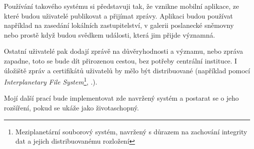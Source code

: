 \documentclass{report}
\begin{document}
Používání takového systému si představuji tak, že vznikne mobilní aplikace, ze které budou uživatelé publikovat a přijímat zprávy. Aplikaci budou používat například na zasedání lokálních zastupitelství, v galerii poslanecké sněmovny nebo prostě když budou svědkem události, která jim přijde významná.

Ostatní uživatelé pak dodají zprávě na důvěryhodnosti a významu, nebo zpráva zapadne, toto se bude dít přirozenou cestou, bez potřeby centrální instituce. I úložiště zpráv a certifikátů uživatelů by mělo být distribuované (například pomocí \textit{Interplanetary File System}\footnote{Meziplanetární souborový systém, navržený s důrazem na zachování integrity dat a jejich distribuovanému rozložení}, \cite{benet14}.).

Mojí další prací bude implementovat zde navržený systém a postarat se o jeho rozšíření, pokud se ukáže jako životaschopný.

\printglossaries
\printbibliography[heading=bibintoc]
\end{document}
